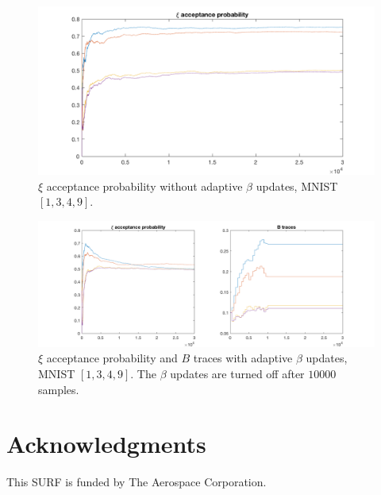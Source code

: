 \documentclass{siamart1116}
\begin{document}
    \begin{figure}[!htb]
        \centering
        \caption{\label{adaptive_mnist_1}$\xi$ acceptance probability without adaptive $\beta$ updates, MNIST $[1,3, 4, 9]$.}
        \includegraphics[width=0.8\linewidth]{adaptive_B/without/xi_accept.png}
    \end{figure}

    \begin{figure}[!htb]
        \centering
        \caption{\label{adaptive_mnist_2}$\xi$ acceptance probability and $B$ traces with adaptive $\beta$ updates, MNIST $[1,3, 4, 9]$. The $\beta$ updates are turned off after $10000$ samples.}
        \includegraphics[width=0.8\linewidth]{adaptive_B/with/xi_B.png}
    \end{figure}
\section{Acknowledgments}
    This SURF is funded by The Aerospace Corporation.



\end{document}
